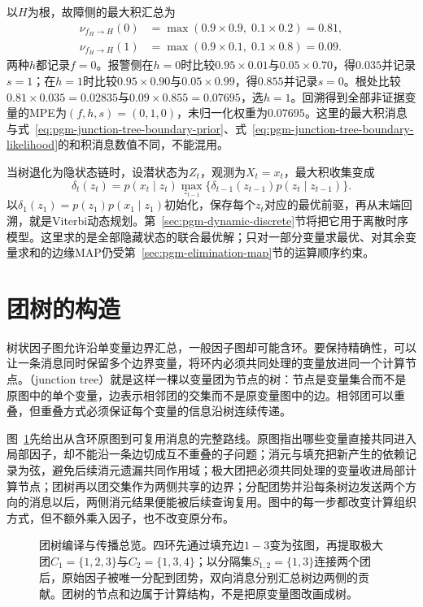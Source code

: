 以$H$为根，故障侧的最大积汇总为
\[
  \begin{aligned}
    \nu_{f_H\to H}(0)&=\max(0.9\times0.9,\;0.1\times0.2)=0.81,\\
    \nu_{f_H\to H}(1)&=\max(0.9\times0.1,\;0.1\times0.8)=0.09.
  \end{aligned}
\]
两种$h$都记录$f=0$。报警侧在$h=0$时比较$0.95\times0.01$与$0.05\times0.70$，得$0.035$并记录$s=1$；在$h=1$时比较$0.95\times0.90$与$0.05\times0.99$，得$0.855$并记录$s=0$。根处比较$0.81\times0.035=0.02835$与$0.09\times0.855=0.07695$，选$h=1$。回溯得到全部非证据变量的MPE为$(f,h,s)=(0,1,0)$，未归一化权重为$0.07695$。这里的最大积消息与式~\eqref{eq:pgm-junction-tree-boundary-prior}、式~\eqref{eq:pgm-junction-tree-boundary-likelihood}的和积消息数值不同，不能混用。

当树退化为隐状态链时，设潜状态为$Z_t$，观测为$X_t=x_t$，最大积收集变成
\[
  \delta_t(z_t)=p(x_t\mid z_t)
    \max_{z_{t-1}}\{\delta_{t-1}(z_{t-1})p(z_t\mid z_{t-1})\}.
\]
以$\delta_1(z_1)=p(z_1)p(x_1\mid z_1)$初始化，保存每个$z_t$对应的最优前驱，再从末端回溯，就是Viterbi动态规划。第~\ref{sec:pgm-dynamic-discrete}节将把它用于离散时序模型。这里求的是全部隐藏状态的联合最优解；只对一部分变量求最优、对其余变量求和的边缘MAP仍受第~\ref{sec:pgm-elimination-map}节的运算顺序约束。

\section{团树的构造}
\label{sec:pgm-junction-tree-construction}

树状因子图允许沿单变量边界汇总，一般因子图却可能含环。要保持精确性，可以让一条消息同时保留多个边界变量，将环内必须共同处理的变量放进同一个计算节点。（junction tree）就是这样一棵以变量团为节点的树：节点是变量集合而不是原图中的单个变量，边表示相邻团的交集而不是原变量图中的边。相邻团可以重叠，但重叠方式必须保证每个变量的信息沿树连续传递。

图~\ref{fig:pgm-junction-tree-triangulation}先给出从含环原图到可复用消息的完整路线。原图指出哪些变量直接共同进入局部因子，却不能沿一条边切成互不重叠的子问题；消元与填充把新产生的依赖记录为弦，避免后续消元遗漏共同作用域；极大团把必须共同处理的变量收进局部计算节点；团树再以团交集作为两侧共享的边界；分配团势并沿每条树边发送两个方向的消息以后，两侧消元结果便能被后续查询复用。图中的每一步都改变计算组织方式，但不额外乘入因子，也不改变原分布。

\begin{figure}[htbp]
  \centering
  
  \caption{团树编译与传播总览。四环先通过填充边$1-3$变为弦图，再提取极大团$C_1=\{1,2,3\}$与$C_2=\{1,3,4\}$；以分隔集$S_{1,2}=\{1,3\}$连接两个团后，原始因子被唯一分配到团势，双向消息分别汇总树边两侧的贡献。团树的节点和边属于计算结构，不是把原变量图改画成树。}
  \label{fig:pgm-junction-tree-triangulation}
\end{figure}

